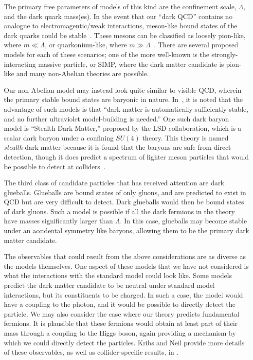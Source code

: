 The primary free parameters of models of this kind are the confinement scale,
$\Lambda$, and the dark quark mass(es). In the event that our ``dark QCD''
contains no analogue to electromagentic/weak interactions, meson-like bound
states of the dark quarks could be stable~\cite{cline_composite_2014}. These
mesons can be classified as loosely pion-like, where $m \ll \Lambda$, or
quarkonium-like, where $m \gg \Lambda$~\cite{kribs_review_2016}. There are
several proposed models for each of these scenarios; one of the more well-known
is the strongly-interacting massive particle, or SIMP, where the dark matter
candidate is pion-like and many non-Abelian theories are possible.

Our non-Abelian model may instead look quite similar to visible QCD, wherein the
primary stable bound states are baryonic in nature. In~\cite{kribs_review_2016},
it is noted that the advantage of such models is that ``dark matter is
automatically sufficiently stable, and no further ultraviolet model-building is
needed.'' One such dark baryon model is ``Stealth Dark Matter,'' proposed by the
LSD collaboration, which is a scalar dark baryon under a confining $SU(4)$
theory. This theory is named \textit{stealth} dark matter because it is found
that the baryons are safe from direct detection, though it does predict a
spectrum of lighter meson particles that would be possible to detect at
colliders~\cite{kribs_review_2016}.

The third class of candidate particles that has received attention are dark
glueballs. Glueballs are bound states of only gluons, and are predicted to exist
in QCD but are very difficult to detect. Dark glueballs would then be bound
states of dark gluons. Such a model is possible if all the dark fermions in the
theory have masses significantly larger than $\Lambda$. In this case, glueballs
may become stable under an accidental symmetry like baryons, allowing them to be
the primary dark matter candidate.

The observables that could result from the above considerations are as diverse
as the models themselves. One aspect of these models that we have not considered
is what the interactions with the standard model could look like. Some models
predict the dark matter candidate to be neutral under standard model
interactions, but its constituents to be charged. In such a case, the model
would have a coupling to the photon, and it would be possible to directly detect
the particle. We may also consider the case where our theory predicts
fundamental fermions. It is plausible that these fermions would obtain at least
part of their mass through a coupling to the Higgs boson, again providing a
mechanism by which we could directly detect the particles. Kribs and Neil
provide more details of these observables, as well as collider-specific results,
in \cite{kribs_review_2016}.


